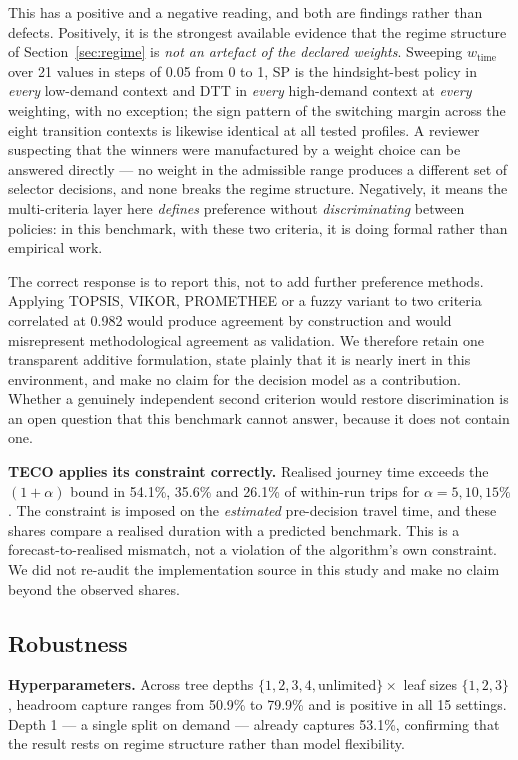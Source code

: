\documentclass[10pt,a4paper]{article}
\begin{document}
This has a positive and a negative reading, and both are findings rather than defects. Positively, it is the strongest available evidence that the regime structure of Section~\ref{sec:regime} is \emph{not an artefact of the declared weights}. Sweeping $w_{\text{time}}$ over 21 values in steps of 0.05 from 0 to 1, SP is the hindsight-best policy in \emph{every} low-demand context and DTT in \emph{every} high-demand context at \emph{every} weighting, with no exception; the sign pattern of the switching margin across the eight transition contexts is likewise identical at all tested profiles. A reviewer suspecting that the winners were manufactured by a weight choice can be answered directly --- no weight in the admissible range produces a different set of selector decisions, and none breaks the regime structure. Negatively, it means the multi-criteria layer here \emph{defines} preference without \emph{discriminating} between policies: in this benchmark, with these two criteria, it is doing formal rather than empirical work.

The correct response is to report this, not to add further preference methods. Applying TOPSIS, VIKOR, PROMETHEE or a fuzzy variant to two criteria correlated at 0.982 would produce agreement by construction and would misrepresent methodological agreement as validation. We therefore retain one transparent additive formulation, state plainly that it is nearly inert in this environment, and make no claim for the decision model as a contribution. Whether a genuinely independent second criterion would restore discrimination is an open question that this benchmark cannot answer, because it does not contain one.

\textbf{TECO applies its constraint correctly.} Realised journey time exceeds the $(1+\alpha)$ bound in 54.1\%, 35.6\% and 26.1\% of within-run trips for $\alpha=5,10,15\%$. The constraint is imposed on the \emph{estimated} pre-decision travel time, and these shares compare a realised duration with a predicted benchmark. This is a forecast-to-realised mismatch, not a violation of the algorithm's own constraint. We did not re-audit the implementation source in this study and make no claim beyond the observed shares.

\subsection{Robustness}\label{sec:robust}
\textbf{Hyperparameters.} Across tree depths $\{1,2,3,4,\text{unlimited}\}\times$ leaf sizes $\{1,2,3\}$, headroom capture ranges from 50.9\% to 79.9\% and is positive in all 15 settings. Depth 1 --- a single split on demand --- already captures 53.1\%, confirming that the result rests on regime structure rather than model flexibility.
\end{document}
